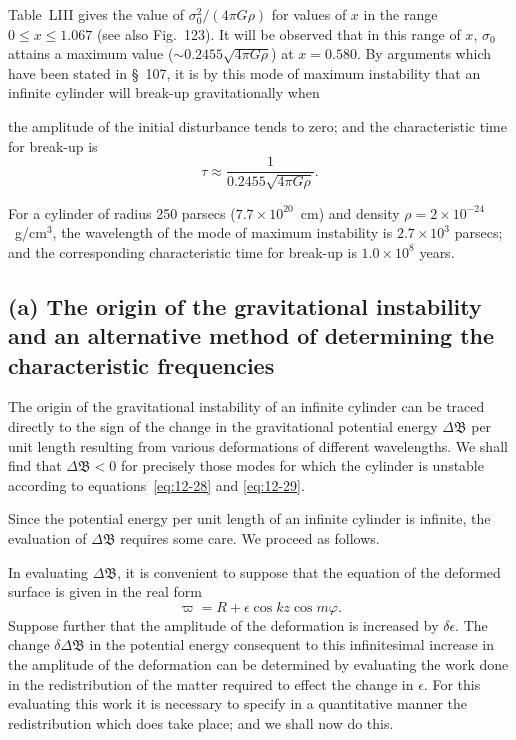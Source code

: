 Table~LIII gives the value of $\sigma_0^2/(4\pi G\rho)$ for values of $x$ in the range $0 \leq x \leq 1.067$ (see also Fig.~123). It will be observed that in this range of $x$, $\sigma_0$ attains a maximum value ($\sim 0.2455\sqrt{4\pi G\rho}$) at $x = 0.580$. By arguments which have been stated in \S~107, it is by this mode of maximum instability that an infinite cylinder will break-up gravitationally when


the amplitude of the initial disturbance tends to zero; and the characteristic time for break-up is
\begin{equation}
\label{eq:12-35}
\tau \approx \frac{1}{0.2455\sqrt{4\pi G\rho}}.
\end{equation}

For a cylinder of radius 250 parsecs ($7.7 \times 10^{20}$~cm) and density $\rho = 2 \times 10^{-24}$~g/cm$^3$, the wavelength of the mode of maximum instability is $2.7 \times 10^3$ parsecs; and the corresponding characteristic time for break-up is $1.0 \times 10^8$ years.

\subsection*{(a) The origin of the gravitational instability and an alternative method of determining the characteristic frequencies}

The origin of the gravitational instability of an infinite cylinder can be traced directly to the sign of the change in the gravitational potential energy $\Delta\mathfrak{B}$ per unit length resulting from various deformations of different wavelengths. We shall find that $\Delta\mathfrak{B} < 0$ for precisely those modes for which the cylinder is unstable according to equations~\eqref{eq:12-28} and \eqref{eq:12-29}.

Since the potential energy per unit length of an infinite cylinder is infinite, the evaluation of $\Delta\mathfrak{B}$ requires some care. We proceed as follows.

In evaluating $\Delta\mathfrak{B}$, it is convenient to suppose that the equation of the deformed surface is given in the real form
\begin{equation}
\label{eq:12-36}
\varpi = R + \epsilon \cos kz \cos m\varphi.
\end{equation}
Suppose further that the amplitude of the deformation is increased by $\delta\epsilon$. The change $\delta\Delta\mathfrak{B}$ in the potential energy consequent to this infinitesimal increase in the amplitude of the deformation can be determined by evaluating the work done in the redistribution of the matter required to effect the change in $\epsilon$. For this evaluating this work it is necessary to specify in a quantitative manner the redistribution which does take place; and we shall now do this.

